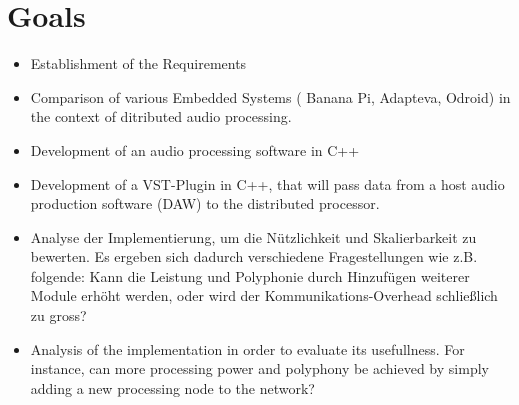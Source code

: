 \section{Goals}

\begin{itemize}

\item Establishment of the Requirements

\item Comparison of various Embedded Systems ( Banana Pi, Adapteva, Odroid) in the context of ditributed audio processing.

\item Development of an audio processing software in C++

\item Development of a VST-Plugin in C++, that will pass data from a host audio production software (DAW) to the
distributed processor.

\item Analyse der Implementierung, um die Nützlichkeit und Skalierbarkeit zu bewerten. Es ergeben sich dadurch verschiedene Fragestellungen wie z.B. folgende: Kann die Leistung und Polyphonie durch Hinzufügen weiterer Module erhöht werden, oder wird der Kommunikations-Overhead schließlich zu gross?

\item Analysis of the implementation in order to evaluate its usefullness. For instance, can more processing power and
polyphony be achieved by simply adding a new processing node to the network?

\end{itemize}


